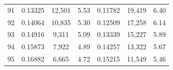 \begin{tabular}{cccc|ccc}
91   & 0.13325                                                          & 12,501                                                                                            & 5.53                                                                                                                       & 0.11782                                                          & 19,419                                                                                            & 6.40                                                                                                                       \\
92   & 0.14064                                                          & 10,835                                                                                            & 5.30                                                                                                                       & 0.12509                                                          & 17,258                                                                                            & 6.14                                                                                                                       \\
93   & 0.14916                                                          & 9,311                                                                                             & 5.09                                                                                                                       & 0.13339                                                          & 15,227                                                                                            & 5.89                                                                                                                       \\
94   & 0.15873                                                          & 7,922                                                                                             & 4.89                                                                                                                       & 0.14257                                                          & 13,322                                                                                            & 5.67                                                                                                                       \\
95   & 0.16882                                                          & 6,665                                                                                             & 4.72                                                                                                                       & 0.15215                                                          & 11,549                                                                                            & 5.46                                                                                                                       \\

\end{tabular}

